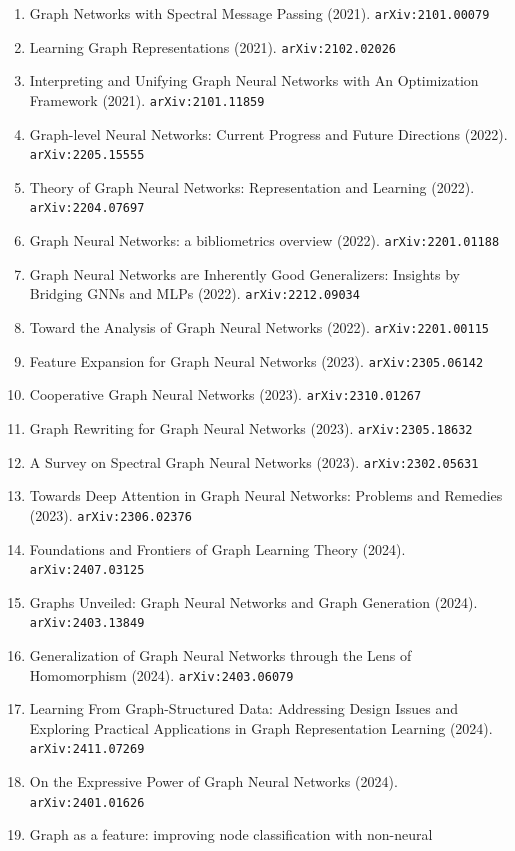 \documentclass[11pt]{article}
\begin{document}
\begin{enumerate}
  \item Graph Networks with Spectral Message Passing (2021). \texttt{arXiv:2101.00079}
  \item Learning Graph Representations (2021). \texttt{arXiv:2102.02026}
  \item Interpreting and Unifying Graph Neural Networks with An Optimization
  Framework (2021). \texttt{arXiv:2101.11859}
  \item Graph-level Neural Networks: Current Progress and Future Directions (2022). \texttt{arXiv:2205.15555}
  \item Theory of Graph Neural Networks: Representation and Learning (2022). \texttt{arXiv:2204.07697}
  \item Graph Neural Networks: a bibliometrics overview (2022). \texttt{arXiv:2201.01188}
  \item Graph Neural Networks are Inherently Good Generalizers: Insights by
  Bridging GNNs and MLPs (2022). \texttt{arXiv:2212.09034}
  \item Toward the Analysis of Graph Neural Networks (2022). \texttt{arXiv:2201.00115}
  \item Feature Expansion for Graph Neural Networks (2023). \texttt{arXiv:2305.06142}
  \item Cooperative Graph Neural Networks (2023). \texttt{arXiv:2310.01267}
  \item Graph Rewriting for Graph Neural Networks (2023). \texttt{arXiv:2305.18632}
  \item A Survey on Spectral Graph Neural Networks (2023). \texttt{arXiv:2302.05631}
  \item Towards Deep Attention in Graph Neural Networks: Problems and Remedies (2023). \texttt{arXiv:2306.02376}
  \item Foundations and Frontiers of Graph Learning Theory (2024). \texttt{arXiv:2407.03125}
  \item Graphs Unveiled: Graph Neural Networks and Graph Generation (2024). \texttt{arXiv:2403.13849}
  \item Generalization of Graph Neural Networks through the Lens of Homomorphism (2024). \texttt{arXiv:2403.06079}
  \item Learning From Graph-Structured Data: Addressing Design Issues and
  Exploring Practical Applications in Graph Representation Learning (2024). \texttt{arXiv:2411.07269}
  \item On the Expressive Power of Graph Neural Networks (2024). \texttt{arXiv:2401.01626}
  \item Graph as a feature: improving node classification with non-neural

\end{enumerate}
\end{document}
